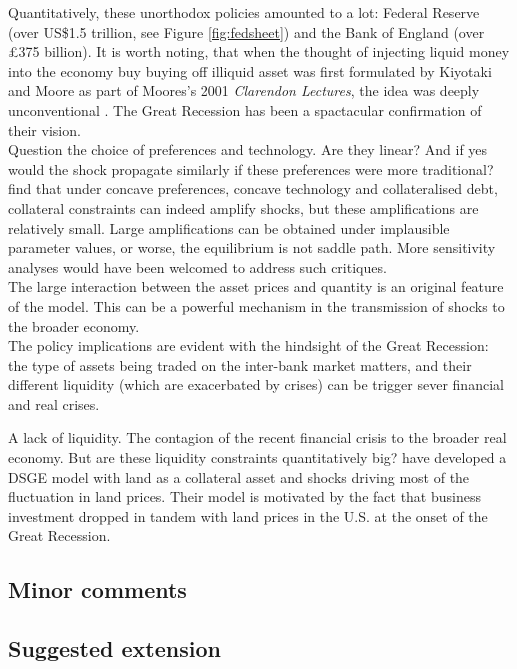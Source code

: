 \documentclass{amsart}
\theoremstyle{definition}
\theoremstyle{remark}
\numberwithin{equation}{section}
\begin{document}
Quantitatively, these unorthodox policies amounted to a lot: Federal Reserve (over US\$1.5 trillion, see Figure \ref{fig:fedsheet}) and the Bank of England (over £375 billion). It is worth noting, that when the thought of injecting liquid money into the economy buy buying off illiquid asset was first formulated by Kiyotaki and Moore as part of Moores's 2001 \textit{Clarendon Lectures}, the idea was deeply unconventional \citep{kiyotaki2001liquidity}. The Great Recession has been a spactacular confirmation of their vision.\\

Question the choice of preferences and technology. Are they linear? And if yes would the shock propagate similarly if these preferences were more traditional? \cite{cordoba2004credit} find that under concave preferences, concave technology and collateralised debt, collateral constraints can indeed amplify shocks, but these amplifications are relatively small. Large amplifications can be obtained under implausible parameter values, or worse, the equilibrium is not saddle path. More sensitivity analyses would have been welcomed to address such critiques.\\

The large interaction between the asset prices and quantity is an original feature of the model. This can be a powerful mechanism in the transmission of shocks to the broader economy.\\

The policy implications are evident with the hindsight of the Great Recession: the type of assets being traded on the inter-bank market matters, and their different liquidity (which are exacerbated by crises) can be trigger sever financial and real crises.

A lack of liquidity. The contagion of the recent financial crisis to the broader real economy. But are these liquidity constraints quantitatively big? \cite{liu2013land} have developed a DSGE model with land as a collateral asset and shocks driving most of the fluctuation in land prices. Their model is motivated by the fact that business investment dropped in tandem with land prices in the U.S. at the onset of the Great Recession.

\subsection*{Minor comments}

\subsection*{Suggested extension}
\end{document}
